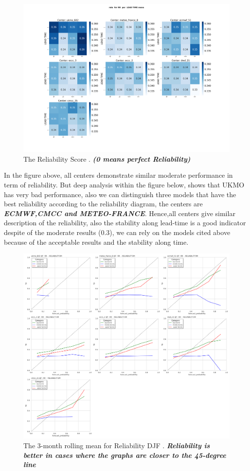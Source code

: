 \begin{figure}[H]
    \centering
    \includegraphics[scale=0.25]{plots/prob/rela/rela_RR_mena.png}
    \caption{The Reliability Score  . \textbf{\textit{(0 means perfect Reliability)}}}
\end{figure}

In the figure above, all centers demonstrate similar moderate performance in term of reliability. But deep analysis within the figure below, shows that UKMO has very bad performance, also we can distinguish three models that have the best reliability according to the reliability diagram, the centers are \textbf{\textit{ECMWF,CMCC and METEO-FRANCE}}. Hence,all centers give similar description of the reliability, also the stability along lead-time is a good indicator despite of the moderate results (0.3), we can rely on the models cited above because of the acceptable results and the stability along time.

\begin{figure}[H]
\centering
\includegraphics[scale=0.3]{plots/prob/rela/rela_diagram_RR_djf.png}
\caption{The 3-month rolling mean for Reliability DJF   . \textbf{\textit{Reliability is better in cases where the graphs are closer to the 45-degree line}}}
\end{figure}


